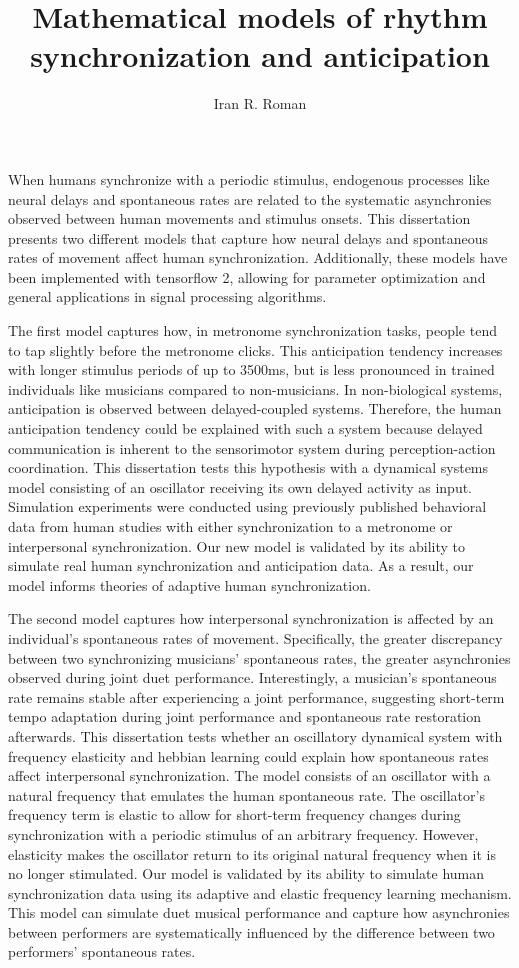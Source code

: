 \documentclass{report}
\begin{document}
\title{Mathematical models of rhythm synchronization and anticipation}
\author{Iran R. Roman}

\beforepreface

When humans synchronize with a periodic stimulus, endogenous processes like neural delays and spontaneous rates are related to the systematic asynchronies observed between human movements and stimulus onsets. This dissertation presents two different models that capture how neural delays and spontaneous rates of movement affect human synchronization. Additionally, these models have been implemented with tensorflow 2, allowing for parameter optimization and general applications in signal processing algorithms.

The first model captures how, in metronome synchronization tasks, people tend to tap slightly before the metronome clicks. This anticipation tendency increases with longer stimulus periods of up to 3500ms, but is less pronounced in trained individuals like musicians compared to non-musicians. In non-biological systems, anticipation is observed between delayed-coupled systems. Therefore, the human anticipation tendency could be explained with such a system because delayed communication is inherent to the sensorimotor system during perception-action coordination. This dissertation tests this hypothesis with a dynamical systems model consisting of an oscillator receiving its own delayed activity as input. Simulation experiments were conducted using previously published behavioral data from human studies with either synchronization to a metronome or interpersonal synchronization. Our new model is validated by its ability to simulate real human synchronization and anticipation data. As a result, our model informs theories of adaptive human synchronization.

The second model captures how interpersonal synchronization is affected by an individual's spontaneous rates of movement. Specifically, the greater discrepancy between two synchronizing musicians' spontaneous rates, the greater asynchronies observed during joint duet performance. Interestingly, a musician's spontaneous rate remains stable after experiencing a joint performance, suggesting short-term tempo adaptation during joint performance and spontaneous rate restoration afterwards. This dissertation tests whether an oscillatory dynamical system with frequency elasticity and hebbian learning could explain how spontaneous rates affect interpersonal synchronization. The model consists of an oscillator with a natural frequency that emulates the human spontaneous rate. The oscillator's frequency term is elastic to allow for short-term frequency changes during synchronization with a periodic stimulus of an arbitrary frequency. However, elasticity makes the oscillator return to its original natural frequency when it is no longer stimulated. Our model is validated by its ability to simulate human synchronization data using its adaptive and elastic frequency learning mechanism. This model can simulate duet musical performance and capture how asynchronies between performers are systematically influenced by the difference between two performers' spontaneous rates.
\end{document}
